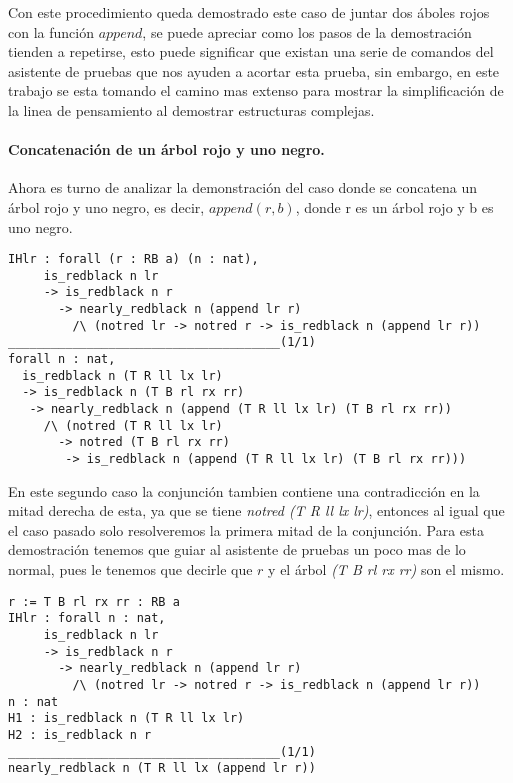 Con este procedimiento queda demostrado este caso de juntar dos \'aboles rojos con la funci\'on
$append$, se puede apreciar como los pasos de la demostraci\'on tienden a repetirse, esto puede
significar que existan una serie de comandos del asistente de pruebas que nos ayuden a acortar
esta prueba, sin embargo, en este trabajo se esta tomando el camino mas extenso para mostrar la
simplificaci\'on de la linea de pensamiento al demostrar estructuras complejas.

\paragraph{Concatenaci\'on de un \'arbol rojo y uno negro.}

Ahora es turno de analizar la demonstraci\'on del caso donde se concatena un \'arbol rojo y uno negro, es decir, $append(r,b)$, donde r es un \'arbol rojo y b es uno negro.

\begin{verbatim}
IHlr : forall (r : RB a) (n : nat),
     is_redblack n lr
     -> is_redblack n r
       -> nearly_redblack n (append lr r)
         /\ (notred lr -> notred r -> is_redblack n (append lr r))
______________________________________(1/1)
forall n : nat,
  is_redblack n (T R ll lx lr)
  -> is_redblack n (T B rl rx rr)
   -> nearly_redblack n (append (T R ll lx lr) (T B rl rx rr))
     /\ (notred (T R ll lx lr)
       -> notred (T B rl rx rr)
        -> is_redblack n (append (T R ll lx lr) (T B rl rx rr)))
\end{verbatim}

En este segundo caso la conjunci\'on tambien contiene una contradicci\'on en la mitad derecha de
esta, ya que se tiene \textit{notred (T R ll lx lr)}, entonces al igual que el caso pasado solo
resolveremos la primera mitad de la conjunci\'on. Para esta demostración tenemos que guiar al asistente de pruebas un poco mas de lo normal, pues le tenemos que decirle que $r$ y el árbol \textit{(T B rl rx rr)} son el mismo.

\begin{verbatim}
r := T B rl rx rr : RB a
IHlr : forall n : nat,
     is_redblack n lr
     -> is_redblack n r
       -> nearly_redblack n (append lr r)
         /\ (notred lr -> notred r -> is_redblack n (append lr r))
n : nat
H1 : is_redblack n (T R ll lx lr)
H2 : is_redblack n r
______________________________________(1/1)
nearly_redblack n (T R ll lx (append lr r))
\end{verbatim}

